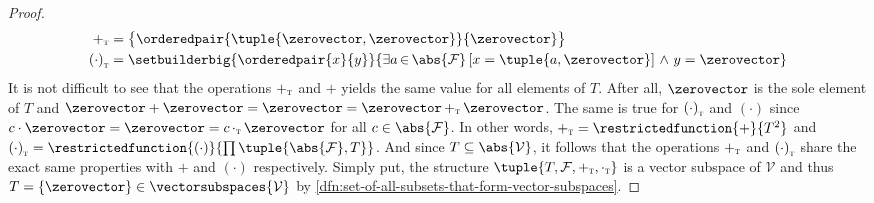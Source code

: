 \begin{proof}
    \begin{equation*}
        \begin{aligned}
            \smallsubscript{+}{T} &= \big\{ \orderedpair{\tuple{\zerovector,\zerovector}}{\zerovector} \big\} \\
            \smallsubscript{(\cdot)}{T} &=
            \setbuilderbig{\orderedpair{x}{y}}{ \exists a\,{\in}\,\abs{\mathcal{F}} \, \mleft[ x = \tuple{a, \zerovector} \mright] \,\,{\land}\,\, y = \zerovector }
        \end{aligned}
    \end{equation*}
    It is not difficult to see that the operations \( \smallsubscript{+}{T} \) and \( + \) yields the same value for all elements of \( T \).
    After all, \( \zerovector \) is the sole element of \( T \) and \(  \zerovector + \zerovector = \zerovector = \zerovector \, \smallsubscript{+}{T} \, \zerovector \).
    The same is true for \( \smallsubscript{(\cdot)}{T} \) and \( (\cdot) \) since
    \( c \cdot \zerovector = \zerovector = c \, \smallsubscript{\cdot}{T} \, \zerovector \) for all \( c \in \abs{\mathcal{F}} \). In other words,
    \( \smallsubscript{+}{T} = \restrictedfunction{+}{T^2} \) and \( \smallsubscript{(\cdot)}{T} = \restrictedfunction{(\cdot)}{\prod \tuple{\abs{\mathcal{F}},T}} \).
    And since \( T \subseteq \abs{\mathcal{V}} \), it follows that the operations \( \smallsubscript{+}{T} \) and \( \smallsubscript{(\cdot)}{T} \) share
    the exact same properties with \( + \) and \( (\cdot) \) respectively.
    Simply put, the structure \( \tuple{T, \mathcal{F}, \smallsubscript{+}{T}, \smallsubscript{\cdot}{T} }\)
    is a vector subspace of \( \mathcal{V} \) and thus \( T = \mleft\{ \zerovector \mright\} \in \vectorsubspaces{\mathcal{V}} \)
    by \cref{dfn:set-of-all-subsets-that-form-vector-subspaces}.


\end{proof}
